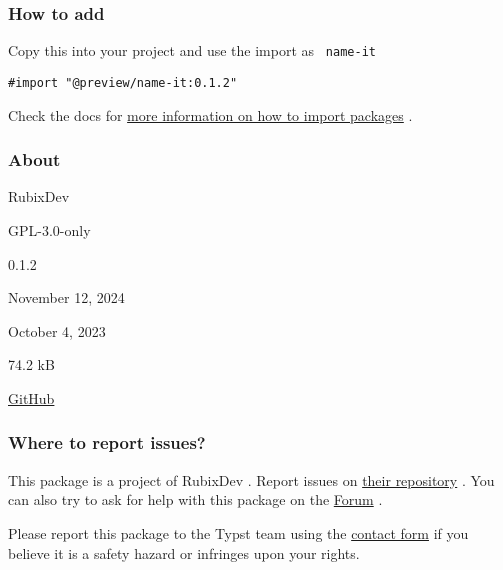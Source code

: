 \subsubsection{How to add}\label{how-to-add}

Copy this into your project and use the import as \texttt{\ name-it\ }

\begin{verbatim}
#import "@preview/name-it:0.1.2"
\end{verbatim}



Check the docs for
\href{https://typst.app/docs/reference/scripting/\#packages}{more
information on how to import packages} .

\subsubsection{About}\label{about}

\begin{description}
\tightlist
\item[Author :]
RubixDev
\item[License:]
GPL-3.0-only
\item[Current version:]
0.1.2
\item[Last updated:]
November 12, 2024
\item[First released:]
October 4, 2023
\item[Archive size:]
74.2 kB
\href{https://packages.typst.org/preview/name-it-0.1.2.tar.gz}{\pandocbounded{}}
\item[Repository:]
\href{https://github.com/RubixDev/typst-name-it}{GitHub}
\end{description}

\subsubsection{Where to report issues?}\label{where-to-report-issues}

This package is a project of RubixDev . Report issues on
\href{https://github.com/RubixDev/typst-name-it}{their repository} . You
can also try to ask for help with this package on the
\href{https://forum.typst.app}{Forum} .

Please report this package to the Typst team using the
\href{https://typst.app/contact}{contact form} if you believe it is a
safety hazard or infringes upon your rights.

